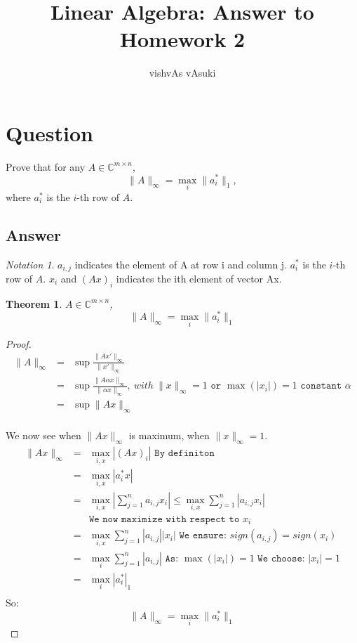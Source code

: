 \documentclass[10pt]{amsart}
\title{Linear Algebra: Answer to Homework 2}
\author{vishvAs vAsuki}
\newtheorem{thm}{Theorem}[subsection]
\theoremstyle{remark}
\newtheorem*{notation}{Notation}
\begin{document}
\maketitle

\section{Question}
Prove that for any $A\in \mathbb{C}^{m\times n}$,
$$ \|A\|_{\infty} = \max_i \|a_i^*\|_1,$$
where $a_i^*$ is the $i$-th row of $A$.
\subsection{Answer}

\begin{notation}
$a_{i,j}$ indicates the element of A at row i and column j. $a_i^*$ is the $i$-th row of $A$. $x_{i}$ and $(Ax)_{i}$ indicates the ith element of vector Ax.
\end{notation}

\begin{thm}
$A\in \mathbb{C}^{m\times n}$,
$$ \|A\|_{\infty} = \max_i \|a_i^*\|_1$$
\end{thm}
\begin{proof}
\begin{eqnarray*}
\|A\|_{\infty} &=& \sup \frac{\|Ax'\|_{\infty}}{\|x'\|_{\infty}}\\
&=& \sup \frac{\|A\alpha x\|_{\infty}}{\|\alpha x\|_{\infty}} , \ with \ \|x\|_{\infty}=1 \texttt{ or } \max(|x_{i}|)=1 \texttt{ constant } \alpha \\
&=& \sup \|Ax\|_{\infty} \\
\end{eqnarray*}

We now see when $\|Ax\|_{\infty}$ is maximum, when $\|x\|_{\infty}=1$.
\begin{eqnarray*}
\|Ax\|_{\infty} &=& \max_{i, x} |(Ax)_{i}| \texttt{ By definiton}\\
&=& \max_{i, x} |a_{i}^{*}x| \\
&=& \max_{i, x} |\sum_{j=1}^{n} a_{i,j}x_{i}| \leq \max_{i, x} \sum_{j=1}^{n} |a_{i,j}x_{i}| \\
&& \texttt{We now maximize with respect to }x_{i}\\
&=& \max_{i, x} \sum_{j=1}^{n} |a_{i,j}||x_{i}| \texttt{ We ensure: }sign(a_{i,j}) = sign(x_{i})\\
&=& \max_{i} \sum_{j=1}^{n} |a_{i,j}| \texttt{ As: }\max(|x_{i}|)=1 \texttt{ We choose: }|x_{i}|=1\\
&=& \max_{i} |a_{i}^{*}|_{1}\\
\end{eqnarray*}
So:
$$ \|A\|_{\infty} = \max_i \|a_i^*\|_1$$
\end{proof}
\end{document}
